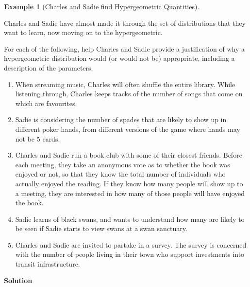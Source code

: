 \documentclass[
  letterpaper,
  DIV=11,
  numbers=noendperiod]{scrreprt}
\providecommand{\tightlist}{%
  \setlength{\itemsep}{0pt}\setlength{\parskip}{0pt}}\usepackage{longtable,booktabs,array}
\theoremstyle{definition}
\theoremstyle{definition}
\newtheorem{example}{Example}[chapter]
\theoremstyle{definition}
\theoremstyle{remark}
\begin{document}
\begin{example}[Charles and Sadie find Hypergeometric
Quantities]\protect\hypertarget{exm-hyper-geometric-list}{}\label{exm-hyper-geometric-list}

Charles and Sadie have almost made it through the set of distributions
that they want to learn, now moving on to the hypergeometric.

For each of the following, help Charles and Sadie provide a
justification of why a hypergeometric distribution would (or would not
be) appropriate, including a description of the parameters.

\begin{enumerate}
\def\labelenumi{\alph{enumi}.}
\tightlist
\item
  When streaming music, Charles will often shuffle the entire library.
  While listening through, Charles keeps tracks of the number of songs
  that come on which are favourites.
\item
  Sadie is considering the number of spades that are likely to show up
  in different poker hands, from different versions of the game where
  hands may not be \(5\) cards.
\item
  Charles and Sadie run a book club with some of their closest friends.
  Before each meeting, they take an anonymous vote as to whether the
  book was enjoyed or not, so that they know the total number of
  individuals who actually enjoyed the reading. If they know how many
  people will show up to a meeting, they are interested in how many of
  those people will have enjoyed the book.
\item
  Sadie learns of black swans, and wants to understand how many are
  likely to be seen if Sadie starts to view swans at a swan sanctuary.
\item
  Charles and Sadie are invited to partake in a survey. The survey is
  concerned with the number of people living in their town who support
  investments into transit infrastructure.
\end{enumerate}

\begin{tcolorbox}[enhanced jigsaw, colback=white, colframe=quarto-callout-color-frame, arc=.35mm, leftrule=.75mm, rightrule=.15mm, opacityback=0, breakable, bottomrule=.15mm, left=2mm, toprule=.15mm]

\vspace{-3mm}\textbf{Solution}\vspace{3mm}


\end{tcolorbox}
\end{example}
\end{document}
